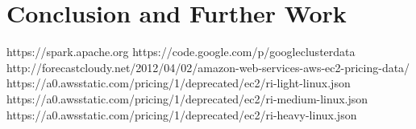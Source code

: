 \documentclass[]{final_report}
\begin{document}


\chapter{Conclusion and Further Work}


\newpage
\begin{thebibliography}{99}
 https://spark.apache.org
 https://code.google.com/p/googleclusterdata
 http://forecastcloudy.net/2012/04/02/amazon-web-services-aws-ec2-pricing-data/ https://a0.awsstatic.com/pricing/1/deprecated/ec2/ri-light-linux.json https://a0.awsstatic.com/pricing/1/deprecated/ec2/ri-medium-linux.json https://a0.awsstatic.com/pricing/1/deprecated/ec2/ri-heavy-linux.json
\end{thebibliography}
\label{endpage}
\end{document}
